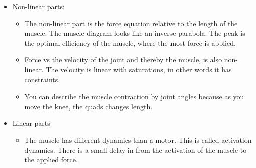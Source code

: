 \documentclass[a4paper]{article}
\begin{document}
\begin{itemize}
	\item Non-linear parts:
		\begin{itemize}
			\item The non-linear part is the force equation relative to the length of the muscle. The muscle diagram looks like an inverse parabola. The peak is the optimal efficiency of the muscle, where the most force is applied. 
			\item Force vs the velocity of the joint and thereby the muscle, is also non-linear. The velocity is linear with saturations, in other words it has constraints. 
			\item You can describe the muscle contraction by joint angles because as you move the knee, the quads changes length. 
		\end{itemize}
	\item Linear parts
		\begin{itemize}
			\item The muscle has different dynamics than a motor. This is called activation dynamics. There is a small delay in from the activation of the muscle to the applied force. 
		\end{itemize}
\end{itemize}
\end{document}
